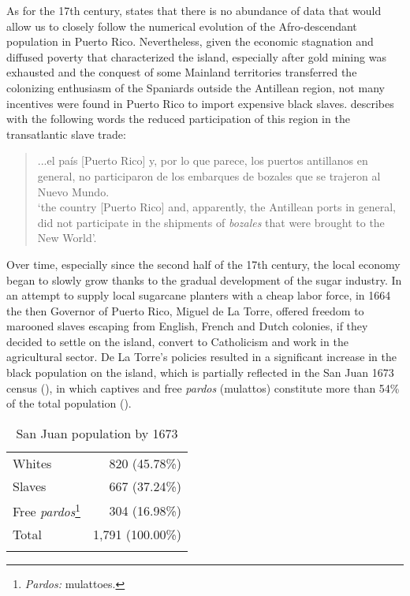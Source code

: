 \documentclass[output=paper,colorlinks,citecolor=brown]{langscibook}
\begin{document}
As for the 17th century, \citet[74]{AlvarezNazario1974} states that there is no abundance of data that would allow us to closely follow the numerical evolution of the Afro-descendant population in Puerto Rico. Nevertheless, given the economic stagnation and diffused poverty that characterized the island, especially after gold mining was exhausted and the conquest of some Mainland territories transferred the colonizing enthusiasm of the Spaniards outside the Antillean region, not many incentives were found in Puerto Rico to import expensive black slaves. \citet[36]{AlvarezNazario1974} describes with the following words the reduced participation of this region in the transatlantic slave trade:

\begin{quote}
...el país [Puerto Rico] y, por lo que parece, los puertos antillanos en general, no participaron de los embarques de bozales que se trajeron al Nuevo Mundo.\\
`the country [Puerto Rico] and, apparently, the Antillean ports in general, did not participate in the shipments of \textit{bozales} that were brought to the New World'.
\end{quote}

Over time, especially since the second half of the 17th century, the local economy began to slowly grow thanks to the gradual development of the sugar industry. In an attempt to supply local sugarcane planters with a cheap labor force, in 1664 the then Governor of Puerto Rico, Miguel de La Torre, offered freedom to marooned slaves escaping from English, French and Dutch colonies, if they decided to settle on the island, convert to Catholicism and work in the agricultural sector. De La Torre’s policies resulted in a significant increase in the black population on the island, which is partially reflected in the San Juan 1673 census (), in which captives and free \textit{pardos} (mulattos) constitute more than 54\% of the total population (\citealt[75]{AlvarezNazario1974}).

\begin{table}
\begin{tabular}{lr}
\lsptoprule
 {Whites}                                                     & 820 \phantom{1}(45.78\%)\\
 {Slaves}                                                     & 667 \phantom{1}(37.24\%)\\
 {Free \textit{pardos}}\footnote{\textit{Pardos:} mulattoes.} & 304 \phantom{1}(16.98\%)\\
 \midrule
 {Total} & 1,791 (100.00\%)\\
\lspbottomrule
\end{tabular}
\caption{San Juan population by 1673}
    \label{tab:visconti:5}
\end{table}
\end{document}
